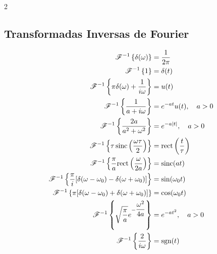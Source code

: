 \documentclass{article}
\begin{document}
\begin{multicols}{2}
\subsection{Transformadas Inversas de Fourier}
$$
\begin{aligned}
  \mathscr{F}^{-1}\left\{\delta(\omega)\right\} &= \frac{1}{2\pi}\\
  \mathscr{F}^{-1}\left\{1\right\} &= \delta(t)\\
  \mathscr{F}^{-1}\left\{\pi\delta(\omega) + \frac{1}{i\omega}\right\} &= u(t)\\
  \mathscr{F}^{-1}\left\{\frac{1}{a + i\omega}\right\} &= e^{-at}u(t), \quad a > 0\\
  \mathscr{F}^{-1}\left\{\frac{2a}{a^2 + \omega^2}\right\} &= e^{-a|t|}, \quad a > 0\\
  \mathscr{F}^{-1}\left\{\tau\,\text{sinc}\left(\frac{\omega\tau}{2}\right)\right\} &= \text{rect}\left(\frac{t}{\tau}\right)\\
  \mathscr{F}^{-1}\left\{\frac{\pi}{a}\text{rect}\left(\frac{\omega}{2a}\right)\right\} &= \text{sinc}(at)\\
  \mathscr{F}^{-1}\left\{\frac{\pi}{i}[\delta(\omega - \omega_0) - \delta(\omega + \omega_0)]\right\} &= \sin(\omega_0 t)\\
  \mathscr{F}^{-1}\left\{\pi[\delta(\omega - \omega_0) + \delta(\omega + \omega_0)]\right\} &= \cos(\omega_0 t)\\
  \mathscr{F}^{-1}\left\{\sqrt{\frac{\pi}{a}}e^{-\dfrac{\omega^2}{4a}}\right\} &= e^{-at^2}, \quad a > 0\\
  \mathscr{F}^{-1}\left\{\frac{2}{i\omega}\right\} &= \text{sgn}(t)\\
\end{aligned}
$$

\end{multicols}
\end{document}
